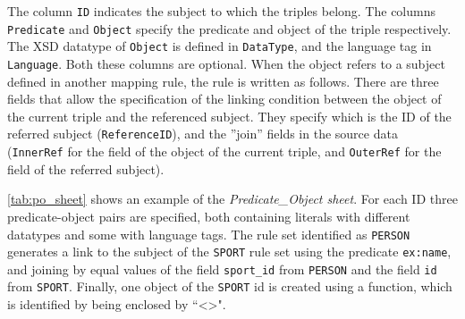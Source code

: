 The column \texttt{ID} indicates the subject to which the triples belong.
The columns \texttt{Predicate} and \texttt{Object} specify the predicate and object of the triple respectively. 
The XSD datatype of \texttt{Object} is defined in \texttt{DataType}, and the language tag in \texttt{Language}. Both these columns are optional. 
When the object refers to a subject defined in another mapping rule, the rule is written as follows. 
There are three fields that allow the specification of the linking condition between the object of the current triple and the referenced subject. 
They specify which is the ID of the referred subject  (\texttt{ReferenceID}), and the ''join'' fields in the source data (\texttt{InnerRef} for the field of the object of the current triple, and \texttt{OuterRef} for the field of the referred subject).  

\cref{tab:po_sheet} shows an example of the \textit{Predicate\_Object sheet}. For each ID three predicate-object pairs are specified, both containing literals with different datatypes and some with language tags. The rule set identified as \texttt{PERSON} generates a link to the subject of the \texttt{SPORT} rule set using the predicate \texttt{ex:name}, and joining by equal values of the field \texttt{sport\_id} from \texttt{PERSON} and the field \texttt{id} from \texttt{SPORT}. Finally, one object of the \texttt{SPORT} id is created using a function, which is identified by being enclosed by ``\textless{}\textgreater{}".

\begin{table}[h!]
\caption{Predicate\_Object sheet.}
\label{tab:po_sheet}
\centering
{}
\end{table}

